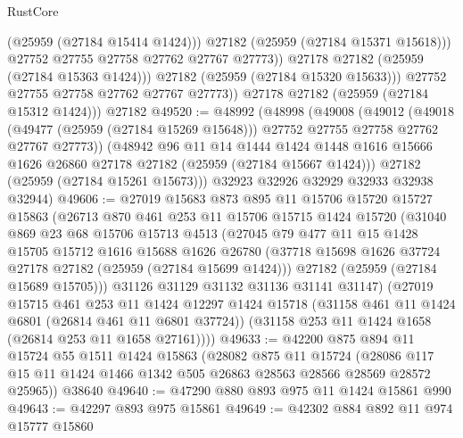 \begin{lexlean}{RustCore}
\begin{coremodule}
                      (@25959 (@27184 @15414 @1424)))
                    @27182
                    (@25959 (@27184 @15371 @15618)))
                  @27752
                  @27755
                  @27758
                  @27762
                  @27767
                  @27773))
              @27178
              @27182
              (@25959 (@27184 @15363 @1424)))
            @27182
            (@25959 (@27184 @15320 @15633)))
          @27752
          @27755
          @27758
          @27762
          @27767
          @27773))
      @27178
      @27182
      (@25959 (@27184 @15312 @1424)))
    @27182
@49520 := @48992
    (@48998
      (@49008
        (@49012
          (@49018
            (@49477 (@25959 (@27184 @15269 @15648)))
            @27752
            @27755
            @27758
            @27762
            @27767
            @27773))
        (@48942
          @96
          @11
          @14
          @1444
          @1424
          @1448
          @1616
          @15666
          @1626
          @26860
          @27178
          @27182
          (@25959 (@27184 @15667 @1424)))
        @27182
        (@25959 (@27184 @15261 @15673)))
      @32923
      @32926
      @32929
      @32933
      @32938
      @32944)
@49606 := @27019
    @15683
    @873
    @895
    @11
    @15706
    @15720
    @15727
    @15863
    (@26713
      @870
      @461
      @253
      @11
      @15706
      @15715
      @1424
      @15720
      (@31040
        @869
        @23
        @68
        @15706
        @15713
        @4513
        (@27045
          @79
          @477
          @11
          @15
          @1428
          @15705
          @15712
          @1616
          @15688
          @1626
          @26780
          (@37718 @15698 @1626 @37724 @27178 @27182 (@25959 (@27184 @15699 @1424)))
          @27182
          (@25959 (@27184 @15689 @15705)))
        @31126
        @31129
        @31132
        @31136
        @31141
        @31147)
      (@27019
        @15715
        @461
        @253
        @11
        @1424
        @12297
        @1424
        @15718
        (@31158 @461 @11 @1424 @6801 (@26814 @461 @11 @6801 @37724))
        (@31158 @253 @11 @1424 @1658 (@26814 @253 @11 @1658 @27161))))
@49633 := @42200
    @875
    @894
    @11
    @15724
    @55
    @1511
    @1424
    @15863
    (@28082
      @875
      @11
      @15724
      (@28086 @117 @15 @11 @1424 @1466 @1342 @505 @26863 @28563 @28566 @28569 @28572 @25965))
    @38640
@49640 := @47290 @880 @893 @975 @11 @1424 @15861 @990
@49643 := @42297 @893 @975 @15861
@49649 := @42302 @884 @892 @11 @974 @15777 @15860

\end{coremodule}
\end{lexlean}

